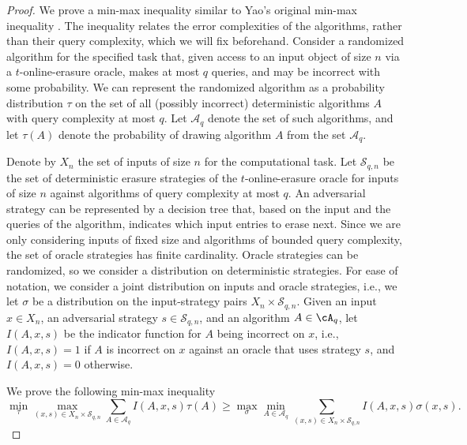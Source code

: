 \documentclass{toc}
\begin{document}
	\begin{proof} %
		
		
		We prove a min-max inequality similar to Yao's original min-max inequality \cite{Yao77}. The inequality relates the error complexities of the algorithms, rather than their query complexity, which we will fix beforehand. 
		Consider a randomized algorithm for the specified task
  that, given access to an input object of size $n$
  via a $t$-online-erasure oracle, makes at most $q$ queries, and may be incorrect with some probability. We can represent the randomized algorithm as a probability distribution $\tau$ on the set of all (possibly incorrect) deterministic algorithms $A$ with query complexity at most $q$. Let $\mathcal{A}_q$ denote the set of such algorithms, and let $\tau(A)$ denote the probability of drawing algorithm $A$ from the set $\mathcal{A}_q$. 
		
		Denote by $X_n$ the set of inputs of size $n$ for the computational task.
		Let $\mathcal{S}_{q,n}$ be the set of deterministic erasure strategies of the $t$-online-erasure oracle for inputs of size $n$ against algorithms of query complexity at most $q$. An adversarial strategy can be represented by a decision tree that, based on the input and the queries of the algorithm, indicates which input entries to erase next. Since we are only considering inputs of fixed size and algorithms of bounded query complexity, the set of oracle strategies has finite cardinality.
		Oracle strategies can be randomized, so we consider a distribution on deterministic strategies. For ease of notation, we consider a joint distribution on inputs and oracle strategies, i.e., we  let $\sigma$ be a distribution on the input-strategy pairs $X_n \times \mathcal{S}_{q,n}$. Given an input $x \in X_n$, an adversarial strategy $s \in \mathcal{S}_{q,n}$, and an algorithm $A \in \cA_q$,
		let $I(A,x, s)$ be the indicator function for $A$ being incorrect on $x$, i.e., $I(A,x,s) = 1$ if $A$ is incorrect on $x$ against an oracle that uses strategy $s$, and $I(A,x,s) = 0$ otherwise. 
		
		We 
  prove
  the following min-max inequality
		\begin{equation}
		\min_\tau \max_{(x, s) \in X_n \times \mathcal{S}_{q,n}} \sum_{A \in \mathcal{A}_q} I(A,x,s)\tau(A)  \geq \max_\sigma \min_{A \in \mathcal{A}_q}\sum_{(x, s) \in X_n \times \mathcal{S}_{q,n}} I(A,x,s)\sigma(x,s).
		\label{eq:yao_error}
		\end{equation}
		

\end{proof}
\end{document}

